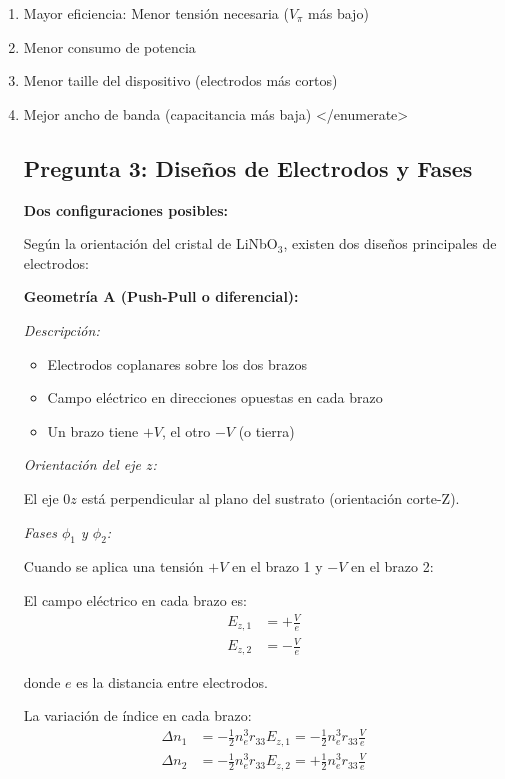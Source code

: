 \documentclass[12pt,a4paper]{article}
\begin{document}
\begin{enumerate}
    \item Mayor eficiencia: Menor tensión necesaria ($V_\pi$ más bajo)
    \item Menor consumo de potencia
    \item Menor taille del dispositivo (electrodos más cortos)
    \item Mejor ancho de banda (capacitancia más baja)
</enumerate>

\subsection{Pregunta 3: Diseños de Electrodos y Fases}

\textbf{Dos configuraciones posibles:}

Según la orientación del cristal de LiNbO$_3$, existen dos diseños principales de electrodos:

\textbf{Geometría A (Push-Pull o diferencial):}

\textit{Descripción:}
\begin{itemize}
    \item Electrodos coplanares sobre los dos brazos
    \item Campo eléctrico en direcciones opuestas en cada brazo
    \item Un brazo tiene $+V$, el otro $-V$ (o tierra)
\end{itemize}

\textit{Orientación del eje $z$:}

El eje $0z$ está perpendicular al plano del sustrato (orientación corte-Z).

\textit{Fases $\phi_1$ y $\phi_2$:}

Cuando se aplica una tensión $+V$ en el brazo 1 y $-V$ en el brazo 2:

El campo eléctrico en cada brazo es:
\begin{align}
    E_{z,1} &= +\frac{V}{e} \\
    E_{z,2} &= -\frac{V}{e}
\end{align}

donde $e$ es la distancia entre electrodos.

La variación de índice en cada brazo:
\begin{align}
    \Delta n_1 &= -\frac{1}{2} n_e^3 r_{33} E_{z,1} = -\frac{1}{2} n_e^3 r_{33} \frac{V}{e} \\
    \Delta n_2 &= -\frac{1}{2} n_e^3 r_{33} E_{z,2} = +\frac{1}{2} n_e^3 r_{33} \frac{V}{e}
\end{align}


\end{enumerate}
\end{document}
